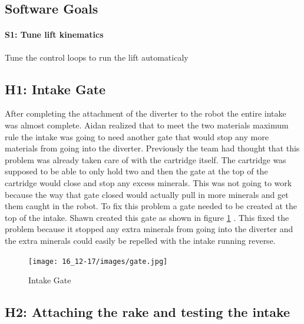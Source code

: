 \documentclass{article}
\begin{document}
\subsection{Software Goals}
\paragraph{S1: Tune lift kinematics}
Tune the control loops to run the lift automaticaly
\newpage
\subsection{H1: Intake Gate}

After completing the attachment of the diverter to the robot the entire intake was almost complete. Aidan realized that to meet the two materials maximum rule the intake was going to need another gate that would stop any more materials from going into the diverter. Previously the team had thought that this problem was already taken care of with the cartridge itself. The cartridge was supposed to be able to only hold two and then the gate at the top of the cartridge would close and stop any excess minerals. This was not going to work because the way that gate closed would actually pull in more minerals and get them caught in the robot. To fix this problem a gate needed to be created at the top of the intake. Shawn created this gate as shown in figure \ref{fig:gate} . This fixed the problem because it stopped any extra minerals from going into the diverter and the extra minerals could easily be repelled with the intake running reverse.

\begin{figure}
    \centering
    \texttt{[image: 16\_12-17/images/gate.jpg]}
    \caption{Intake Gate}
    \label{fig:gate}
\end{figure}

\subsection{H2: Attaching the rake and testing the intake}
\end{document}
